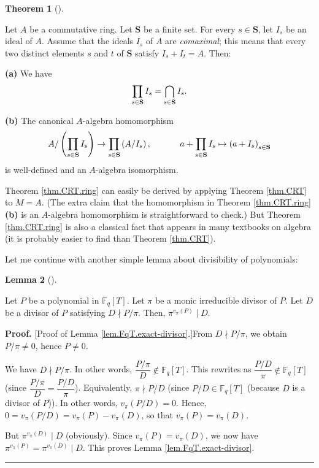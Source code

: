 \documentclass[numbers=enddot,12pt,final,onecolumn,notitlepage]{scrartcl}%
\theoremstyle{definition}
\newtheorem{theo}{Theorem}[section]
\newenvironment{theorem}[1][]
{\begin{theo}[#1]\begin{leftbar}}
{\end{leftbar}\end{theo}}
\newtheorem{lem}[theo]{Lemma}
\newenvironment{lemma}[1][]
{\begin{lem}[#1]\begin{leftbar}}
{\end{leftbar}\end{lem}}
\newenvironment{proof}[1][Proof]{\noindent\textbf{#1.} }{\ \rule{0.5em}{0.5em}}
\let\prodnonlimits\prod
\renewcommand{\prod}{\prodnonlimits\limits}
\begin{document}
\begin{theorem}
\label{thm.CRT.ring}Let $A$ be a commutative ring. Let $\mathbf{S}$ be a
finite set. For every $s\in\mathbf{S}$, let $I_{s}$ be an ideal of $A$. Assume
that the ideals $I_{s}$ of $A$ are \textit{comaximal}; this means that every
two distinct elements $s$ and $t$ of $\mathbf{S}$ satisfy $I_{s}+I_{t}=A$. Then:

\textbf{(a)} We have
\[
\prod\limits_{s\in\mathbf{S}}I_{s}=\bigcap_{s\in\mathbf{S}}I_{s}.
\]


\textbf{(b)} The canonical $A$-algebra homomorphism
\[
A/\left(  \prod\limits_{s\in\mathbf{S}}I_{s}\right)  \rightarrow
\prod\limits_{s\in\mathbf{S}}\left(  A/I_{s}\right)
,\ \ \ \ \ \ \ \ \ \ a+\prod\limits_{s\in\mathbf{S}}I_{s}\mapsto\left(
a+I_{s}\right)  _{s\in\mathbf{S}}%
\]
is well-defined and an $A$-algebra isomorphism.
\end{theorem}

Theorem \ref{thm.CRT.ring} can easily be derived by applying Theorem
\ref{thm.CRT} to $M=A$. (The extra claim that the homomorphism in Theorem
\ref{thm.CRT.ring} \textbf{(b)} is an $A$-algebra homomorphism is
straightforward to check.) But Theorem \ref{thm.CRT.ring} is also a classical
fact that appears in many textbooks on algebra (it is probably easier to find
than Theorem \ref{thm.CRT}).

Let me continue with another simple lemma about divisibility of polynomials:

\begin{lemma}
\label{lem.FqT.exact-divisor}Let $P$ be a polynomial in $\mathbb{F}_{q}\left[
T\right]  $. Let $\pi$ be a monic irreducible divisor of $P$. Let $D$ be a
divisor of $P$ satisfying $D\nmid P/\pi$. Then, $\pi^{v_{\pi}\left(  P\right)
}\mid D$.
\end{lemma}

\begin{proof}
[Proof of Lemma \ref{lem.FqT.exact-divisor}.]From $D\nmid P/\pi$, we obtain
$P/\pi\neq0$, hence $P\neq0$.

We have $D\nmid P/\pi$. In other words, $\dfrac{P/\pi}{D}\notin\mathbb{F}%
_{q}\left[  T\right]  $. This rewrites as $\dfrac{P/D}{\pi}\notin%
\mathbb{F}_{q}\left[  T\right]  $ (since $\dfrac{P/\pi}{D}=\dfrac{P/D}{\pi}$).
Equivalently, $\pi\nmid P/D$ (since $P/D\in\mathbb{F}_{q}\left[  T\right]  $
(because $D$ is a divisor of $P$)). In other words, $v_{\pi}\left(
P/D\right)  =0$. Hence, $0=v_{\pi}\left(  P/D\right)  =v_{\pi}\left(
P\right)  -v_{\pi}\left(  D\right)  $, so that $v_{\pi}\left(  P\right)
=v_{\pi}\left(  D\right)  $.

But $\pi^{v_{\pi}\left(  D\right)  }\mid D$ (obviously). Since $v_{\pi}\left(
P\right)  =v_{\pi}\left(  D\right)  $, we now have $\pi^{v_{\pi}\left(
P\right)  }=\pi^{v_{\pi}\left(  D\right)  }\mid D$. This proves Lemma
\ref{lem.FqT.exact-divisor}.
\end{proof}
\end{document}
